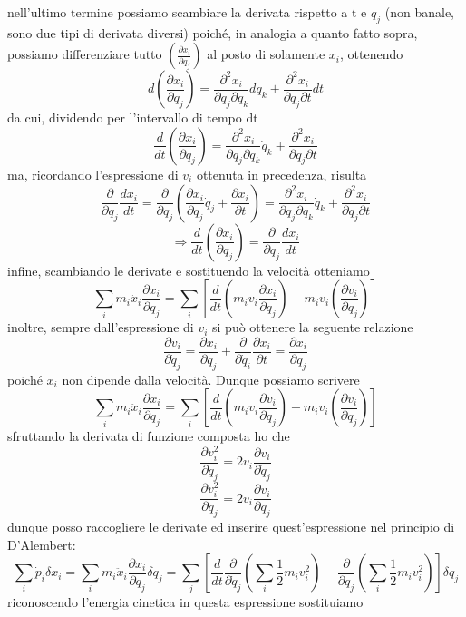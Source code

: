 \documentclass[
10pt, %
a4paper, %
oneside, %
headinclude,footinclude, %
BCOR5mm, %
]{scrartcl}
\begin{document}
nell'ultimo termine possiamo scambiare la derivata rispetto a t e \(q_j\) (non banale, sono due tipi di derivata diversi) poiché, in analogia a quanto fatto sopra, possiamo differenziare tutto \( \left(\frac{\partial x_i}{\partial q_j}\right) \) al posto di solamente \(x_i\), ottenendo
\[d\left(\frac{\partial x_i}{\partial q_j}\right) = \frac{\partial^2 x_i}{\partial q_j \partial q_k}dq_k + \frac{\partial^2 x_i}{\partial q_j \partial t}dt\]
da cui, dividendo per l'intervallo di tempo dt
\[\frac{d}{dt}\left(\frac{\partial x_i}{\partial q_j}\right) =  \frac{\partial^2 x_i}{\partial q_j \partial q_k}\dot{q}_k + \frac{\partial^2 x_i}{\partial q_j \partial t}\]
ma, ricordando l'espressione di \(v_i\) ottenuta in precedenza, risulta 
\[\frac{\partial}{\partial q_j} \frac{dx_i}{dt} = \frac{\partial }{\partial q_j}\left(\frac{\partial x_i}{\partial q_j}\dot{q}_j + \frac{\partial x_i}{\partial t}\right) =  \frac{\partial^2 x_i}{\partial q_j \partial q_k}\dot{q}_k + \frac{\partial^2 x_i}{\partial q_j \partial t}\]
\[\Rightarrow \frac{d}{dt}\left(\frac{\partial x_i}{\partial q_j}\right) = \frac{\partial}{\partial q_j} \frac{dx_i}{dt}\]
infine, scambiando le derivate e sostituendo la velocità otteniamo
\[\sum_i m_i \ddot{x}_i\frac{\partial x_i}{\partial q_j} = \sum_i \left[\frac{d}{dt}\left(m_i v_i\frac{\partial x_i}{\partial {q}_j}\right) - m_i v_i\left(\frac{\partial v_i}{\partial q_j}\right)\right]\]
inoltre, sempre dall'espressione di \(v_i\) si può ottenere la seguente relazione
\[\frac{\partial v_i}{\partial \dot{q}_j} = \frac{\partial x_i}{\partial q_j} + \frac{\partial}{\partial \dot{q}_i}\frac{\partial x_i}{\partial t} = \frac{\partial x_i}{\partial q_j}\]
poiché \(x_i\) non dipende dalla velocità. Dunque possiamo scrivere
\[\sum_i m_i \ddot{x}_i\frac{\partial x_i}{\partial q_j} = \sum_i \left[\frac{d}{dt}\left(m_i v_i\frac{\partial v_i}{\partial \dot{q}_j}\right) - m_i v_i\left(\frac{\partial v_i}{\partial q_j}\right)\right]\]
sfruttando la derivata di funzione composta ho che 
\[\frac{\partial v^2_i}{\partial \dot{q}_j} = 2v_i\frac{\partial v_i}{\partial \dot{q}_j} \]
\[\frac{\partial v^2_i}{\partial {q}_j} = 2v_i\frac{\partial v_i}{\partial {q}_j} \]
dunque posso raccogliere le derivate ed inserire quest'espressione nel principio di D'Alembert:
\[\sum_i \dot{p}_i\delta x_i = \sum_i m_i \ddot{x}_i\frac{\partial x_i}{\partial q_j}\delta q_j = \sum_j \left[\frac{d}{dt}\frac{\partial }{\partial \dot{q}_j}\left(\sum_i\frac{1}{2}m_i v^2_i\right) - \frac{\partial}{\partial q_j}\left(\sum_i\frac{1}{2}m_i v^2_i\right)\right]\delta q_j\]
riconoscendo l'energia cinetica in questa espressione sostituiamo
\end{document}
